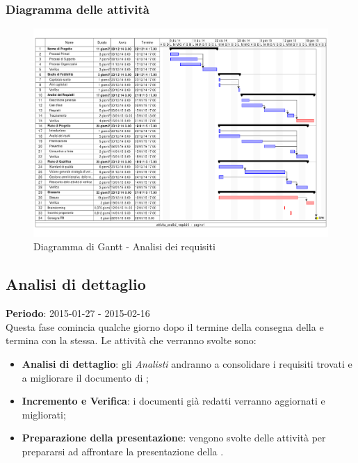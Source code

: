 		\subsubsection{Diagramma delle attività} %
		\label{ssub:diagramma_delle_attivita}
			\begin{figure}[htbp]
				\centering
				\centerline{\includegraphics[scale=0.7]{images/d_attivita_analisi_requisiti.pdf}}
				\caption{Diagramma di Gantt - Analisi dei requisiti}
				\label{fig:gantt_analisi_requisiti}				
			\end{figure}
	
	
	\subsection{Analisi di dettaglio} %
	\label{sub:analisi_di_dettaglio}
	\textbf{Periodo}: 2015-01-27 - 2015-02-16 \\
	Questa fase comincia qualche giorno dopo il termine della consegna della \RR{} e termina con la \RR{} stessa.
	Le attività che verranno svolte sono:
		\begin{itemize}
			\item \textbf{Analisi di dettaglio}: gli \emph{Analisti} andranno a consolidare i requisiti trovati e a migliorare il documento di \docNameVersionAdR;
			\item \textbf{Incremento e Verifica}: i documenti già redatti verranno aggiornati e migliorati;
			\item \textbf{Preparazione della presentazione}: vengono svolte delle attività per prepararsi ad affrontare la presentazione della \RR.
		\end{itemize}
	
